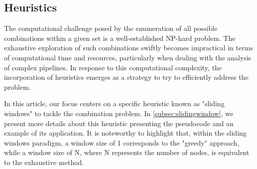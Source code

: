 \subsection{Heuristics}
The computational challenge posed by the enumeration of all possible combinations within a given set is a well-established NP-hard problem.
The exhaustive exploration of such combinations swiftly becomes impractical in terms of computational time and resources,
particularly when dealing with the analysis of complex pipelines.
In response to this computational complexity,
the incorporation of heuristics emerges as a strategy to try to efficiently address the problem.

In this article, our focus centers on a specific heuristic known as "sliding windows" to tackle the combination problem.
In \cref{subsec:slidingwindow}, we present more details about this heuristic presenting the pseudocode and an example of its application.
It is noteworthy to highlight that, within the sliding windows paradigm, a window size of 1 corresponds to the "greedy" approach,
while a window size of N, where N represents the number of nodes, is equivalent to the exhaustive method.
